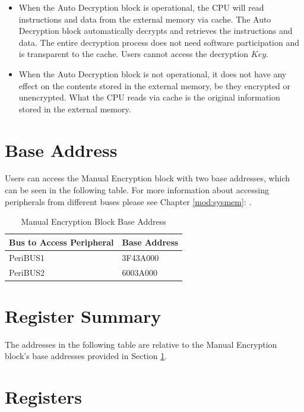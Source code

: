 \documentclass[main\_\_EN.tex]{subfiles}
\begin{document}
\begin{tiplisting}
\vspace{-2em}
\begin{itemize}
\item When the Auto Decryption block is operational, the CPU will read instructions and data from the external memory via cache. The Auto Decryption block automatically decrypts and retrieves the instructions and data. The entire decryption process does not need software participation and is transparent to the cache. Users cannot access the decryption \begin{math}Key\end{math}.

\item When the Auto Decryption block is not operational, it does not have any effect on the contents stored in the external memory, be they encrypted or unencrypted. What the CPU reads via cache is the original information stored in the external memory.

\end{itemize}
\end{tiplisting}

\section{Base Address}\label{section:ManEnBaseaddress}

Users can access the Manual Encryption block with two base addresses, which can be seen in the following table. For more information about accessing peripherals from different buses please see Chapter \ref{mod:sysmem}: \textit{}.

\begin{longtable}[c]{ | l | C{3cm} | }
\caption{Manual Encryption Block Base Address}\label{table:XTSENTRY}
\\\hline
{}
Bus to Access Peripheral      & Base Address\\
    \hline
PeriBUS1      & \hexprefix{}3F43A000      \\
    \hline
PeriBUS2    & \hexprefix{}6003A000      \\
    \hline
\end{longtable}

\hypertarget{extmemencr-reg-summ}{}
\section{Register Summary}

The addresses in the following table are relative to the Manual Encryption block's base addresses provided in Section \ref{section:ManEnBaseaddress}.


\section{Registers}

\end{document}
